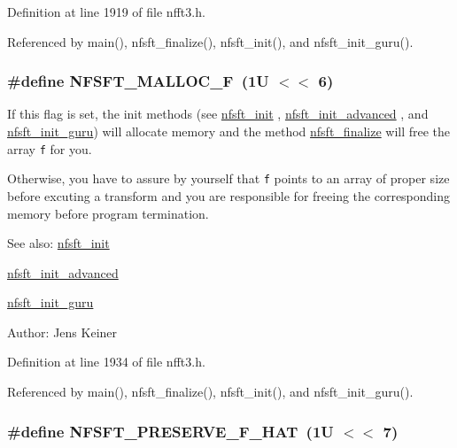 Definition at line 1919 of file nfft3.h.

Referenced by main(), nfsft\_\-finalize(), nfsft\_\-init(), and nfsft\_\-init\_\-guru().\hypertarget{group__nfsft_gf3bc3ab774cda0c1c765e97066893d30}{
\subsubsection{\setlength{\rightskip}{0pt plus 5cm}\#define NFSFT\_\-MALLOC\_\-F~(1U $<$$<$ 6)}}
\label{group__nfsft_gf3bc3ab774cda0c1c765e97066893d30}


If this flag is set, the init methods (see \hyperlink{group__nfsft_g65cda3f4a3edc5eb39c697cf34b1f0b9}{nfsft\_\-init} , \hyperlink{group__nfsft_ge7dca3e41afdb39e8c518af414878c18}{nfsft\_\-init\_\-advanced} , and \hyperlink{group__nfsft_g60466ed37643b6b7b7c1638056604d2b}{nfsft\_\-init\_\-guru}) will allocate memory and the method \hyperlink{group__nfsft_ga63e193a27d84059742ff25ff81e2ed1}{nfsft\_\-finalize} will free the array {\tt f} for you. 

Otherwise, you have to assure by yourself that {\tt f} points to an array of proper size before excuting a transform and you are responsible for freeing the corresponding memory before program termination.

\begin{Desc}
\item[See also:]\hyperlink{group__nfsft_g65cda3f4a3edc5eb39c697cf34b1f0b9}{nfsft\_\-init} 

\hyperlink{group__nfsft_ge7dca3e41afdb39e8c518af414878c18}{nfsft\_\-init\_\-advanced} 

\hyperlink{group__nfsft_g60466ed37643b6b7b7c1638056604d2b}{nfsft\_\-init\_\-guru} \end{Desc}
\begin{Desc}
\item[Author:]Jens Keiner \end{Desc}


Definition at line 1934 of file nfft3.h.

Referenced by main(), nfsft\_\-finalize(), nfsft\_\-init(), and nfsft\_\-init\_\-guru().\hypertarget{group__nfsft_gc8a292845f0bdec6b0d8ef6eb693a00e}{
\subsubsection{\setlength{\rightskip}{0pt plus 5cm}\#define NFSFT\_\-PRESERVE\_\-F\_\-HAT~(1U $<$$<$ 7)}}
\label{group__nfsft_gc8a292845f0bdec6b0d8ef6eb693a00e}


